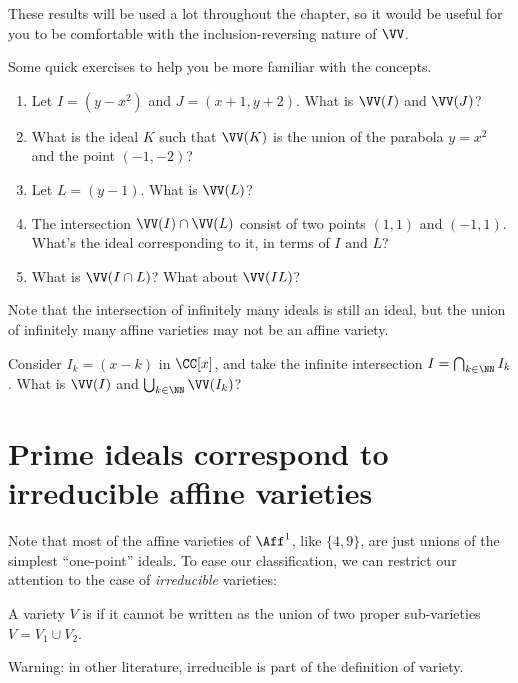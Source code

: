 These results will be used a lot throughout the chapter, so it would be useful
for you to be comfortable with the inclusion-reversing nature of $\VV$.
\begin{exercise}
	Some quick exercises to help you be more familiar with the concepts.
	\begin{enumerate}
		\item Let $I=(y-x^2)$ and $J=(x+1, y+2)$. What is $\VV(I)$ and $\VV(J)$?
		\item What is the ideal $K$ such that $\VV(K)$ is the union of the
			parabola $y=x^2$ and the point $(-1, -2)$?
		\item Let $L=(y-1)$. What is $\VV(L)$?
		\item The intersection $\VV(I) \cap \VV(L)$ consist of two points $(1,
			1)$ and $(-1, 1)$. What's the ideal corresponding to it, in terms of
			$I$ and $L$?
		\item What is $\VV(I \cap L)$? What about $\VV(I L)$?
	\end{enumerate}
\end{exercise}

\begin{ques}
Note that the intersection of infinitely many ideals is still an ideal, but the
union of infinitely many affine varieties may not be an affine variety.

Consider $I_k = (x-k)$ in $\CC[x]$, and take the infinite intersection
$I = \bigcap_{k \in \NN} I_k$. What is $\VV(I)$ and $\bigcup_{k \in \NN}
\VV(I_k)$?
\end{ques}

\section{Prime ideals correspond to irreducible affine varieties}

Note that most of the affine varieties of $\Aff^1$, like $\{4,9\}$,
are just unions of the simplest ``one-point'' ideals.
To ease our classification,
we can restrict our attention to the case of \emph{irreducible} varieties:
\begin{definition}
	A variety $V$ is  if it cannot be written
	as the union of two proper sub-varieties $V = V_1 \cup V_2$.
\end{definition}
\begin{abuse}
	Warning: in other literature,
	irreducible is part of the definition of variety.
\end{abuse}

